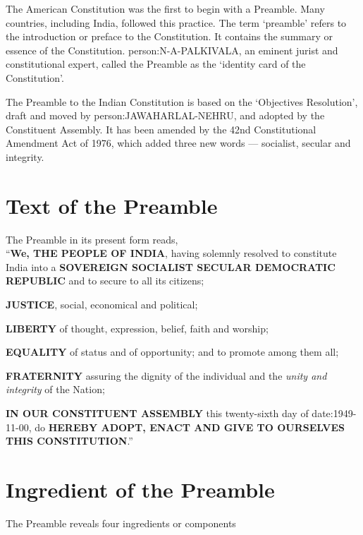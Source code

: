 \begin{multicols}{2}

The American Constitution was the first to begin with a Preamble. Many countries, including India, followed this practice. The term `preamble' refers to the introduction or preface to the Constitution. It contains the summary or essence of the Constitution. \gls{person:N-A-PALKIVALA}, an eminent jurist and constitutional expert, called the Preamble as the `identity card of the Constitution'.

The Preamble to the Indian Constitution is based on the `Objectives Resolution', draft and moved by \gls{person:JAWAHARLAL-NEHRU}, and adopted by the Constituent Assembly. It has been amended by the 42nd Constitutional Amendment Act of 1976, which added three new words — socialist, secular and integrity.

\section{Text of the Preamble}
The Preamble in its present form reads,\\

``\textbf{We, THE PEOPLE OF INDIA}, having solemnly resolved to constitute India into a \textbf{SOVEREIGN SOCIALIST SECULAR DEMOCRATIC REPUBLIC} and to secure to all its citizens;
\begin{list}{}{}
  \item \textbf{JUSTICE}, social, economical and political;
  \item \textbf{LIBERTY} of thought, expression, belief, faith and worship;
  \item \textbf{EQUALITY} of status and of opportunity; and to promote among them all;
  \item \textbf{FRATERNITY} assuring the dignity of the individual and the \textit{unity and integrity} of the Nation;
\end{list}
\textbf{IN OUR CONSTITUENT ASSEMBLY} this twenty-sixth day of \gls{date:1949-11-00}, do \textbf{HEREBY ADOPT, ENACT AND GIVE TO OURSELVES THIS CONSTITUTION}.''

\section{Ingredient of the Preamble}
The Preamble reveals four ingredients or components


\end{multicols}
